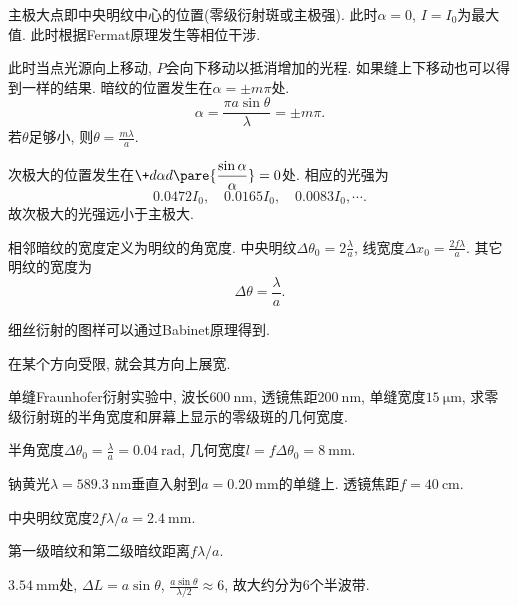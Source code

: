 \documentclass{ctexart}
\begin{document}
主极大点即中央明纹中心的位置(零级衍射斑或主极强). 此时$\alpha = 0$, $I=I_0$为最大值. 此时根据Fermat原理发生等相位干涉.
\par
此时当点光源向上移动, $P$会向下移动以抵消增加的光程. 如果缝上下移动也可以得到一样的结果. 暗纹的位置发生在$\alpha = \pm m\pi$处.
\[ \alpha = \frac{\pi a\sin\theta}{\lambda} = \pm m\pi. \]
若$\theta$足够小, 则$\theta = \displaystyle \frac{m\lambda}{a}$.
\par
次极大的位置发生在$\displaystyle \+d\alpha d{}\pare{\frac{\sin\alpha}{\alpha}} = 0$处. 相应的光强为
\[ 0.0472I_0,\quad 0.0165I_0,\quad 0.0083I_0, \cdots. \]
故次极大的光强远小于主极大.
\par
相邻暗纹的宽度定义为明纹的角宽度. 中央明纹$\displaystyle \Delta\theta_0 = 2\frac{\lambda}{a}$, 线宽度$\Delta x_0 = \displaystyle \frac{2f\lambda}{a}$. 其它明纹的宽度为
\[ \Delta\theta = \frac{\lambda}{a}. \]
\begin{remark}
    细丝衍射的图样可以通过Babinet原理得到.
\end{remark}
在某个方向受限, 就会其方向上展宽.
\begin{sample}
    \begin{ex}
        单缝Fraunhofer衍射实验中, 波长$\SI{600}{\nano\meter}$, 透镜焦距$\SI{200}{\nano\meter}$, 单缝宽度$\SI{15}{\micro\meter}$, 求零级衍射斑的半角宽度和屏幕上显示的零级斑的几何宽度.
    \end{ex}
    \begin{solution}
        半角宽度$\displaystyle \Delta\theta_0 = \frac{\lambda}{a} = \SI{0.04}{\radian}$, 几何宽度$\displaystyle l = f\Delta \theta_0 = \SI{8}{\milli\meter}$.
    \end{solution}
\end{sample}
\begin{sample}
    \begin{ex}
        钠黄光$\lambda = \SI{589.3}{\nano\meter}$垂直入射到$a=\SI{0.20}{\milli\meter}$的单缝上. 透镜焦距$f=\SI{40}{\centi\meter}$.
        \begin{cenum}
            \item 中央明纹宽度$2f\lambda / a = \SI{2.4}{\milli\meter}$.
            \item 第一级暗纹和第二级暗纹距离$f\lambda/a$.
            \item $\SI{3.54}{\milli\meter}$处, $\Delta L = a\sin\theta$, $\displaystyle \frac{a\sin\theta}{\lambda/2}\approx 6$, 故大约分为$6$个半波带.
        \end{cenum}
    \end{ex}
\end{sample}
\end{document}

